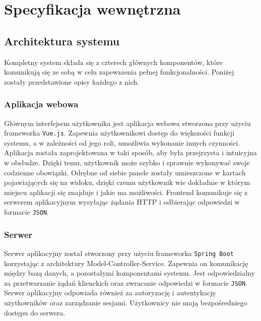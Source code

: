\chapter{Specyfikacja wewnętrzna}
\label{ch:05}

\section{Architektura systemu}


Kompletny system składa się z czterech głównych komponentów, które komunikują się ze sobą w celu zapewnienia pełnej funkcjonalności. Poniżej zostały przedstawione opisy każdego z nich.

\subsection{Aplikacja webowa}

Głównym interfejsem użytkownika jest aplikacja webowa stworzona przy użyciu frameworka \texttt{Vue.js}. Zapewnia użytkownikowi dostęp do większości funkcji systemu, a w zależności od jego roli, umożliwia wykonanie innych czynności. Aplikacja została zaprojektowana w taki sposób, aby była przejrzysta i intuicyjna w obsłudze. Dzięki temu, użytkownik może szybko i sprawnie wykonywać swoje codzienne obowiązki. Odrębne od siebie panele zostały umieszczone w kartach pojawiających się na widoku, dzięki czemu użytkownik wie dokładnie w którym miejscu aplikacji się znajduje i jakie ma możliwości. Frontend komunikuje się z serwerem aplikacyjnym wysyłając żądania HTTP i odbierając odpowiedzi w formacie \texttt{JSON}.

\subsection{Serwer}

Serwer aplikacyjny został stworzony przy użyciu frameworka \texttt{Spring Boot} korzystając z architektury Model-Controller-Service. Zapewnia on komunikację między bazą danych, a pozostałymi komponentami systemu. Jest odpowiedzialny za przetwarzanie żądań klienckich oraz zwracanie odpowiedzi w formacie \texttt{JSON}. Serwer aplikacyjny odpowiada również za autoryzację i autentykację użytkowników oraz zarządzanie sesjami. Użytkownicy nie mają bezpośredniego dostępu do serwera.


